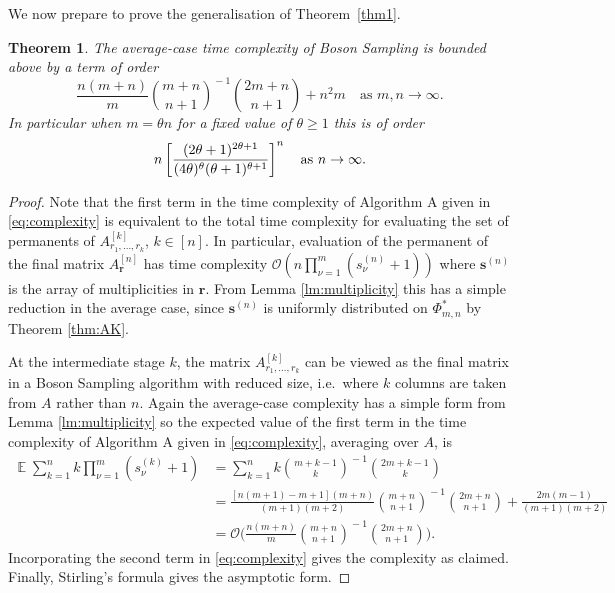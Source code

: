 \documentclass[a4paper,11pt]{article}
\newtheorem{thm}{Theorem}
\newcommand{\EX}{\mathop{{}\mathbb{E}}}
\newcommand{\bigo}[1]{\mathcal{O}(#1)}
\newcommand{\biggo}[1]{\mathcal{O}\bigg(#1\bigg)}
\def\BS/{Boson Sampling}
\begin{document}
We now prepare to prove the generalisation of Theorem~\ref{thm1}.
\begin{thm}\label{thm:1.1}
	The average-case time complexity of \BS/ is bounded above by a term of order 
	$$ \frac{n(m+n)}{m} \binom{ m+ n}{n+1}^{\!-1} \binom{2 m + n}{n+1} + n^2m \quad \text{as $m,n \to \infty$}. $$
	In particular when $m= \theta n$ for a fixed value of $\theta \geqslant 1$ this is of order 
	$$n \left[\frac{(2 \theta+1)^{2 \theta+1}}{(4 \theta)^\theta(\theta+1)^{\theta+1}}\right]^n \quad \text{as $ n \to \infty$}.$$
\end{thm} 
\begin{proof}
Note that the first term in the time complexity of Algorithm A given in \eqref{eq:complexity}	is equivalent to the total time complexity for evaluating the set of permanents of $A_{r_1,\dots, r_k}^{[k]}$, $k \in [n]$.  In particular, evaluation of the permanent of the final matrix $A_\mathbf{r}^{[n]}$ has time complexity $\bigo{n\prod_{\nu=1}^m(s_\nu^{(n)}+1)}$ where $\mathbf{s}^{(n)}$ is the array of multiplicities in $\mathbf{r}$.  From Lemma \ref{lm:multiplicity} this has a simple reduction in the average case, since $\mathbf{s}^{(n)}$ is uniformly distributed on $\Phi^*_{m,n}$ by Theorem \ref{thm:AK}.  

At the intermediate stage $k$, the matrix $A_{r_1,\dots, r_k}^{[k]}$ can be viewed as the final matrix in a \BS/ algorithm with reduced size, i.e.\ where $k$ columns are taken from $A$ rather than $n$.  Again the average-case complexity has a simple form from Lemma \ref{lm:multiplicity} so the expected value of the first term in the time complexity of Algorithm A given in \eqref{eq:complexity}, averaging over $A$, is 
\begin{align*} 
\EX \sum_{k=1}^n k \prod_{\nu=1}^m (s_\nu^{(k)}+1)  
&= \sum_{k=1}^n  k \binom{ m+ k-1}{k}^{\!-1} \binom{2 m + k -1}{k}\\
&= \frac{[n(m+1)-m+1](m+n)}{(m+1)(m+2)}\binom{m+ n}{n+1}^{\!-1} \binom{2 m + n}{n+1} + \frac{2 m(m-1)}{(m+1)(m+2)}\\
&= \biggo{\frac{n(m+n)}{m} \binom{ m+ n}{n+1}^{\!-1} \binom{2 m + n}{n+1}}. 
\end{align*}
Incorporating the second term in \eqref{eq:complexity} gives the complexity as claimed. Finally, Stirling's formula gives the asymptotic form. 
\end{proof}





\end{document}
